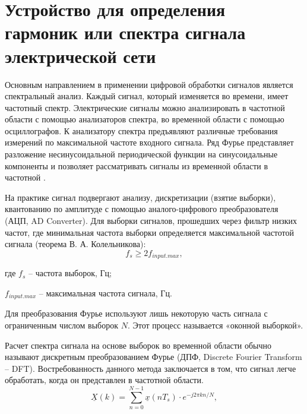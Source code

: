 



\section{Устройство для определения гармоник или спектра сигнала электрической сети} \label{sec:ch3/sect10}

Основным направлением в применении цифровой обработки сигналов является спектральный анализ. Каждый сигнал, который изменяется во времени, имеет частотный спектр. Электрические сигналы можно 
анализировать в частотной области с помощью анализаторов спектра, во временной области с помощью осциллографов. К анализатору спектра предъявляют различные требования измерений по максимальной частоте входного сигнала. Ряд Фурье представляет разложение несинусоидальной периодической функции на синусоидальные компоненты и позволяет рассматривать сигналы из временной области в частотной \cite{information-measuring2018}.

На практике сигнал подвергают анализу, дискретизации (взятие выборки), квантованию по амплитуде с помощью аналого-цифрового преобразователя (АЦП, AD Converter). Для выборки сигналов, прошедших 
через фильтр низких частот, где минимальная частота выборки определяется максимальной частотой сигнала (теорема В. А. Колельникова): 
\begin{equation}
 \label{eq:equation3.9.1}
 f_s \geqslant 2f_{input.max},
\end{equation}

где $f_s$ – частота выборок, Гц;

$f_{input.max}$ – максимальная частота сигнала, Гц.

Для преобразования Фурье используют лишь некоторую часть сигнала с ограниченным числом выборок 
$N$. Этот процесс называется «оконной выборкой».

Расчет спектра сигнала на основе выборок во временной области обычно называют дискретным преобразованием Фурье (ДПФ, Discrete Fourier Transform – DFT). Востребованность данного метода заключается в том, что сигнал легче обработать, когда он представлен в частотной области.
\begin{equation}
\label{eq:equation3.9.2}
	\underline{X}(k) = \sum^{N-1}_{n=0} \underline{x}(nT_s) \cdot e^{-j2 \pi kn/N},
\end{equation}

